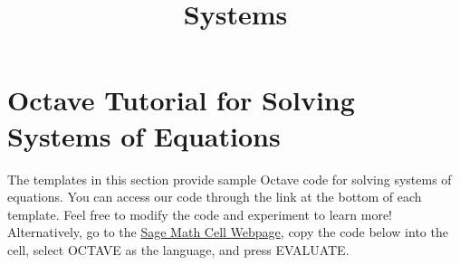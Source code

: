 \documentclass{ximera}
\title{Systems} \license{CC BY-NC-SA 4.0}
\begin{document}
\begin{abstract}
\end{abstract}
\maketitle

\section*{Octave Tutorial for Solving Systems of Equations}\label{sec:oct_systems}

The templates in this section provide sample Octave code for solving systems of equations. You can access our code through the link at the bottom of each template.  Feel free to modify the code and experiment to learn more!  Alternatively, go to the \href{https://sagecell.sagemath.org/}{Sage Math Cell Webpage}, copy the code below into the cell, select OCTAVE as the language, and press EVALUATE.  
\end{document}
